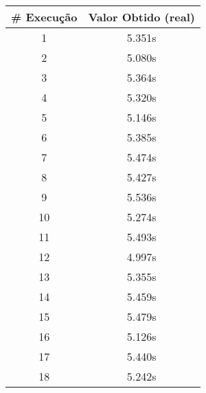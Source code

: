 \documentclass[11pt]{article}
\begin{document}
\begin{table}[!h]
\begin{center}
\begin{minipage}{0.48\textwidth}
\begin{tabular}{| c | c |}
			\hline
				\textbf{\# Execução} &  \textbf{Valor Obtido (real)} \\ \hline
				1 & 5.351s \\ \hline
				2 & 5.080s \\ \hline
				3 & 5.364s \\ \hline
				4 & 5.320s \\ \hline
				5 & 5.146s \\ \hline
				6 & 5.385s \\ \hline
				7 & 5.474s \\ \hline
				8 & 5.427s \\ \hline
				9 & 5.536s \\ \hline
				10 & 5.274s \\ \hline
				11 & 5.493s \\ \hline
				12 & 4.997s \\ \hline
				13 & 5.355s \\ \hline
				14 & 5.459s \\ \hline
				15 & 5.479s \\ \hline
				16 & 5.126s \\ \hline
				17 & 5.440s \\ \hline
				18 & 5.242s \\ \hline
			\end{tabular}
		\end{minipage}
	\end{center}
\end{table}
\end{document}
